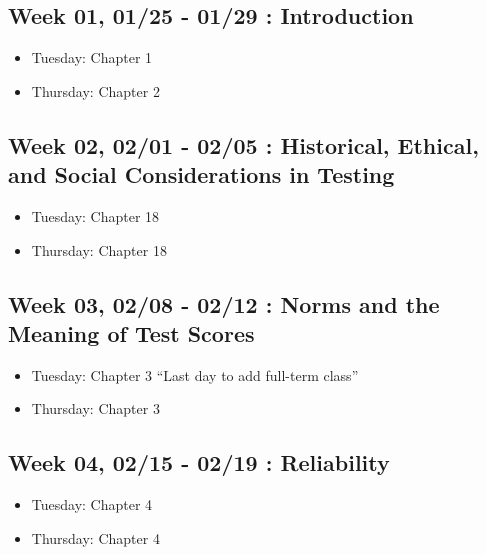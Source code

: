 \documentclass[11pt,]{article}
\providecommand{\tightlist}{%
  \setlength{\itemsep}{0pt}\setlength{\parskip}{0pt}}
\begin{document}
\hypertarget{week-01-0125---0129-introduction}{%
\subsection{Week 01, 01/25 - 01/29 :
Introduction}\label{week-01-0125---0129-introduction}}

\begin{itemize}
\tightlist
\item
  Tuesday: Chapter 1
\item
  Thursday: Chapter 2
\end{itemize}

\hypertarget{week-02-0201---0205-historical-ethical-and-social-considerations-in-testing}{%
\subsection{Week 02, 02/01 - 02/05 : Historical, Ethical, and Social
Considerations in
Testing}\label{week-02-0201---0205-historical-ethical-and-social-considerations-in-testing}}

\begin{itemize}
\tightlist
\item
  Tuesday: Chapter 18
\item
  Thursday: Chapter 18
\end{itemize}

\hypertarget{week-03-0208---0212-norms-and-the-meaning-of-test-scores}{%
\subsection{Week 03, 02/08 - 02/12 : Norms and the Meaning of Test
Scores}\label{week-03-0208---0212-norms-and-the-meaning-of-test-scores}}

\begin{itemize}
\tightlist
\item
  Tuesday: Chapter 3 ``Last day to add full-term class''
\item
  Thursday: Chapter 3
\end{itemize}

\hypertarget{week-04-0215---0219-reliability}{%
\subsection{Week 04, 02/15 - 02/19 :
Reliability}\label{week-04-0215---0219-reliability}}

\begin{itemize}
\tightlist
\item
  Tuesday: Chapter 4
\item
  Thursday: Chapter 4
\end{itemize}
\end{document}
